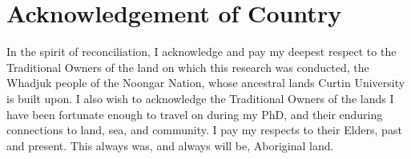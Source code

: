 \chapter*{Acknowledgement of Country} 

In the spirit of reconciliation, I acknowledge and pay my deepest respect to the Traditional Owners of the land on which this research was conducted, the Whadjuk people of the Noongar Nation, whose ancestral lands Curtin University is built upon. I also wish to acknowledge the Traditional Owners of the lands I have been fortunate enough to travel on during my PhD, and their enduring connections to land, sea, and community. I pay my respects to their Elders, past and present. This always was, and always will be, Aboriginal land.